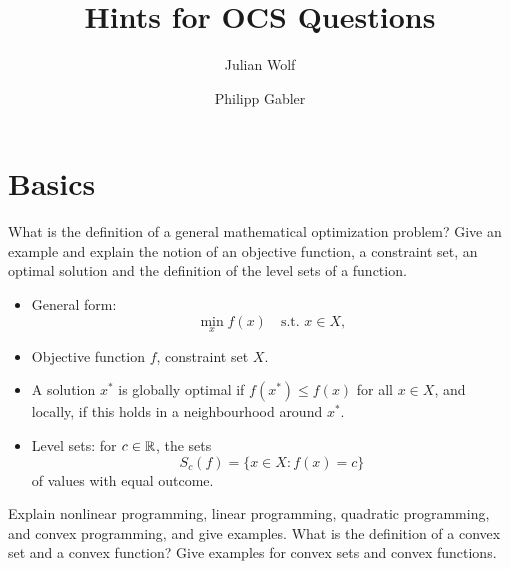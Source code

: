 \documentclass{article}
\title{Hints for OCS Questions}
\author{Julian Wolf \and Philipp Gabler}
\begin{document}
\maketitle

\section{Basics}

\begin{question}
  What is the definition of a general mathematical optimization problem?  Give an example and
  explain the notion of an objective function, a constraint set, an optimal solution and the
  definition of the level sets of a function.
\end{question}
\begin{itemize}
\item General form:
  \begin{equation*}
    \min_{x} f(x) \quad \text{s.t. } x \in X,
  \end{equation*}
\item Objective function \(f\), constraint set \(X\).
\item A solution \(x^*\) is globally optimal if \(f(x^*) \leq f(x)\) for all \(x \in X\), and
  locally, if this holds in a neighbourhood around \(x^*\).
\item Level sets: for \(c \in \mathbb{R}\), the sets
  \begin{equation*}
    S_c(f) = \{x \in X: f(x) = c\}
  \end{equation*}
  of values with equal outcome.
\end{itemize}

\begin{question}
  Explain nonlinear programming, linear programming, quadratic programming, and convex programming,
  and give examples. What is the definition of a convex set and a convex function? Give examples for
  convex sets and convex functions.
\end{question}
\end{document}
